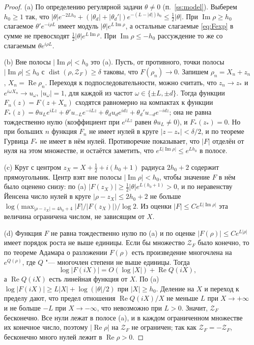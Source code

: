 \documentclass[12pt,a4paper]{article}
\numberwithin{equation}{section}
\theoremstyle{definition}
\newcommand{\abs}[1]{\lvert#1\rvert}
\newcommand{\Imm}{\operatorname{Im}}
\newcommand{\Ree}{\operatorname{Re}}
\newcommand{\Zf}{\mathcal Z_F}
\begin{document}
\begin{proof}
(a) По определению регулярной задачи $\theta\ne0$ (п.~\ref{ss:model}). Выберем $h_0\ge1$ так, что
$\abs\theta e^{-2Lh_0}+(\abs{\theta_d}+\abs{\theta_d'})e^{-(L-\abs d)h_0}\le\frac12\abs\theta$. При
$\Imm\rho\ge h_0$ слагаемое $\theta'e^{-i\rho L}$ имеет модуль $\abs\theta e^{L\Imm\rho}$, а остальные
слагаемые \eqref{eq:Fexp} в сумме не превосходят $\frac12\abs\theta e^{L\Imm\rho}$. При
$\Imm\rho\le-h_0$ рассуждение то же со слагаемым $\theta e^{i\rho L}$.

(b) Вне полосы $\abs{\Imm\rho}<h_0$ это (a). Пусть, от противного, точки полосы
$\abs{\Imm\rho}\le h_0$ с $\operatorname{dist}(\rho,\Zf)\ge\delta$ таковы, что
$F(\rho_n)\to0$. Запишем $\rho_n=X_n+z_n$, $X_n=\Ree\rho_n$. Переходя к
подпоследовательности, можно считать, что $z_n\to z_\ast$ и $e^{i\omega X_n}\to u_\omega$,
$\abs{u_\omega}=1$, для каждой из частот $\omega\in\{\pm L,\pm d\}$. Тогда функции
$F_n(z)=F(z+X_n)$ сходятся равномерно на компактах к функции
$F_\ast(z)=\theta u_L e^{iLz}+\theta' u_{-L}e^{-iLz}+\theta_d u_d e^{idz}
+\theta_d' u_{-d}e^{-idz}$; она не равна тождественно нулю (коэффициент при $e^{iLz}$ равен
$\theta u_L\ne0$), и $F_\ast(z_\ast)=0$. Но при больших $n$ функция $F_n$ не имеет нулей в круге
$\abs{z-z_\ast}<\delta/2$, и по теореме Гурвица $F_\ast$ не имеет в нём нулей. Противоречие
показывает, что $\abs F$ отделён от нуля на этом множестве, и остаётся заметить, что
$e^{L\abs{\Imm\rho}}\le e^{Lh_0}$ в полосе.

(c) Круг с центром $z_X=X+\frac12+i(h_0+1)$ радиуса $2h_0+2$ содержит прямоугольник. Центр взят
вне полосы $\abs{\Imm\rho}<h_0$, чтобы значение $F$ в нём было оценено снизу: по (a)
$\abs{F(z_X)}\ge\frac12\abs\theta e^{L(h_0+1)}>0$, и по неравенству Йенсена число нулей в круге
$\abs{\rho-z_X}\le2h_0+2$ не
больше $\log\bigl(\max_{\abs{\rho-z_X}=4h_0+4}\abs F/\abs{F(z_X)}\bigr)/\log2$. Из оценки
$\abs F\le Ce^{L\abs{\Imm\rho}}$ эта величина ограничена числом, не зависящим от $X$.

(d) Функция $F$ не равна тождественно нулю по (a) и по оценке
$\abs{F(\rho)}\le Ce^{L\abs\rho}$ имеет порядок роста не выше единицы. Если бы множество $\Zf$
было конечно, то по теореме Адамара о разложении $F(\rho)$ есть произведение многочлена на
$e^{Q(\rho)}$, где $Q$ "--- многочлен степени не выше единицы. Тогда
\[
 \log\abs{F(iX)}=O(\log\abs X)+\Ree Q(iX),
\]
а $\Ree Q(iX)$ есть линейная функция от $X$. По (a) $\log\abs{F(iX)}\ge L\abs X+\log(\abs\theta/2)$
при $\abs X\ge h_0$. Деление на $X$ и переход к пределу дают, что предел отношения
$\Ree Q(iX)/X$ не меньше $L$ при $X\to+\infty$ и не больше $-L$ при $X\to-\infty$, что невозможно
при $L>0$. Значит, $\Zf$ бесконечно. Все нули лежат в полосе (a), и в каждом
ограниченном множестве их конечное число, поэтому $\abs{\Ree\rho}$ на $\Zf$ не ограничен; так как
$\Zf=-\Zf$, бесконечно много нулей лежит в $\Ree\rho>0$.
\end{proof}
\end{document}
